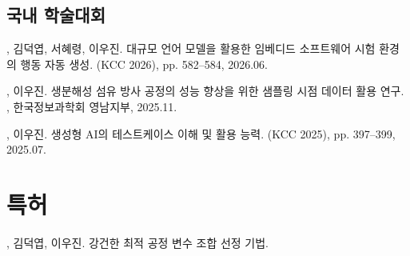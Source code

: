 \documentclass[korean,small]{cv}
\begin{document}
\subsection*{국내 학술대회}
\begin{publications}
  \item {}, 김덕엽, 서혜령, 이우진\corr.
        대규모 언어 모델을 활용한 임베디드 소프트웨어 시험 환경의 행동 자동 생성.
         (KCC 2026), pp. 582--584, 2026.06.

  \item {}, 이우진\corr.
        생분해성 섬유 방사 공정의 성능 향상을 위한 샘플링 시점 데이터 활용 연구.
        ,
        한국정보과학회 영남지부, 2025.11.

  \item {}, 이우진\corr.
        생성형 AI의 테스트케이스 이해 및 활용 능력.
         (KCC 2025), pp. 397--399, 2025.07.
\end{publications}

\section{특허}
\begin{publications}
  \item {}, 김덕엽, 이우진. 강건한 최적 공정 변수 조합 선정 기법.
\end{publications}

\end{document}
